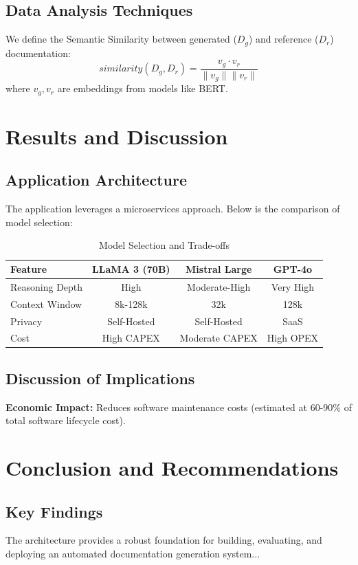 \documentclass[12pt, a4paper]{report}
\begin{document}
\section{Data Analysis Techniques}
We define the Semantic Similarity between generated ($D_g$) and reference ($D_r$) documentation:
\begin{equation}
    similarity(D_g, D_r) = \frac{v_g \cdot v_r}{\|v_g\| \|v_r\|}
\end{equation}
where $v_g, v_r$ are embeddings from models like BERT.

\chapter{Results and Discussion}

\section{Application Architecture}
The application leverages a microservices approach. Below is the comparison of model selection:

\begin{table}[ht]
    \centering
    \caption{Model Selection and Trade-offs}
    \begin{tabular}{lccc}
        \toprule
        \textbf{Feature} & \textbf{LLaMA 3 (70B)} & \textbf{Mistral Large} & \textbf{GPT-4o} \\
        \midrule
        Reasoning Depth & High & Moderate-High & Very High \\
        Context Window & 8k-128k & 32k & 128k \\
        Privacy & Self-Hosted & Self-Hosted & SaaS \\
        Cost & High CAPEX & Moderate CAPEX & High OPEX \\
        \bottomrule
    \end{tabular}
\end{table}

\section{Discussion of Implications}
\textbf{Economic Impact:} Reduces software maintenance costs (estimated at 60-90\% of total software lifecycle cost).

\chapter{Conclusion and Recommendations}

\section{Key Findings}
The architecture provides a robust foundation for building, evaluating, and deploying an automated documentation generation system...
\end{document}
